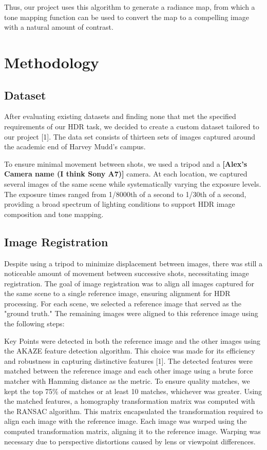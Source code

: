 \documentclass[
	a4paper, %
	10pt, %
	unnumberedsections, %
	twoside, %
]{LTJournalArticle}
\begin{document}
Thus, our project uses this algorithm to generate a radiance map, from which a tone mapping function can be used to convert the map to a compelling image with a natural amount of contrast.


\section{Methodology}

\subsection{Dataset}
After evaluating existing datasets and finding none that met the specified requirements of our HDR task, we decided to create a custom dataset tailored to our project [1]. The data set consists of thirteen sets of images captured around the academic end of Harvey Mudd’s campus. 

To ensure minimal movement between shots, we used a tripod and a \textbf{[Alex’s Camera name (I think Sony A7)]} camera. At each location, we captured several images of the same scene while systematically varying the exposure levels. The exposure times ranged from 1/8000th of a second to 1/30th of a second, providing a broad spectrum of lighting conditions to support HDR image composition and tone mapping.  

\subsection{Image Registration}
Despite using a tripod to minimize displacement between images, there was still a noticeable amount of movement between successive shots, necessitating image registration. The goal of image registration was to align all images captured for the same scene to a single reference image, ensuring alignment for HDR processing.
For each scene, we selected a reference image that served as the "ground truth." The remaining images were aligned to this reference image using the following steps:

Key Points were detected in both the reference image and the other images using the AKAZE feature detection algorithm. This choice was made for its efficiency and robustness in capturing distinctive features [1]. The detected features were matched between the reference image and each other image using a brute force matcher with Hamming distance as the metric. To ensure quality matches, we kept the top 75\% of matches or at least 10 matches, whichever was greater. Using the matched features, a homography transformation matrix was computed with the RANSAC algorithm. This matrix encapsulated the transformation required to align each image with the reference image. Each image was warped using the computed transformation matrix, aligning it to the reference image. Warping was necessary due to perspective distortions caused by lens or viewpoint differences. 
\end{document}
